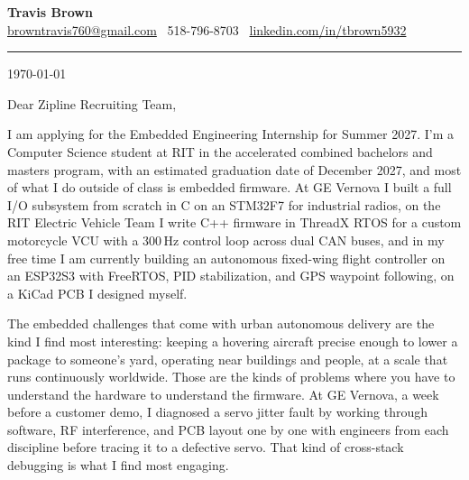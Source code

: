 \documentclass[11pt]{article}
\begin{document}
\begin{center}
  {\LARGE\textbf{Travis Brown}}\\[3pt]
  \href{mailto:browntravis760@gmail.com}{browntravis760@gmail.com} \textbullet\
  518-796-8703 \textbullet\
  \href{https://www.linkedin.com/in/tbrown5932}{linkedin.com/in/tbrown5932}
\end{center}

\vspace{2pt}
\noindent\rule{\linewidth}{0.5pt}
\vspace{10pt}

\begin{flushright}
  \today
\end{flushright}

\vspace{4pt}

Dear Zipline Recruiting Team,

I am applying for the Embedded Engineering Internship for Summer 2027.
I'm a Computer Science student at RIT in the accelerated combined bachelors and masters
program, with an estimated graduation date of December 2027, and most of what I do outside
of class is embedded firmware. At GE Vernova I built a full I/O subsystem from scratch in
C on an STM32F7 for industrial radios, on the RIT Electric Vehicle Team I write C++
firmware in ThreadX RTOS for a custom motorcycle VCU with a 300\,Hz control loop across
dual CAN buses, and in my free time I am currently building an autonomous fixed-wing flight
controller on an ESP32S3 with FreeRTOS, PID stabilization, and GPS waypoint following,
on a KiCad PCB I designed myself.

The embedded challenges that come with urban autonomous delivery are the kind I find most
interesting: keeping a hovering aircraft precise enough to lower a package to someone's yard,
operating near buildings and people, at a scale that runs continuously worldwide. Those are
the kinds of problems where you have to understand the hardware to understand the firmware.
At GE Vernova, a week before a customer demo, I diagnosed a servo jitter fault by working
through software, RF interference, and PCB layout one by one with engineers from each
discipline before tracing it to a defective servo. That kind of cross-stack debugging is
what I find most engaging.
\end{document}
